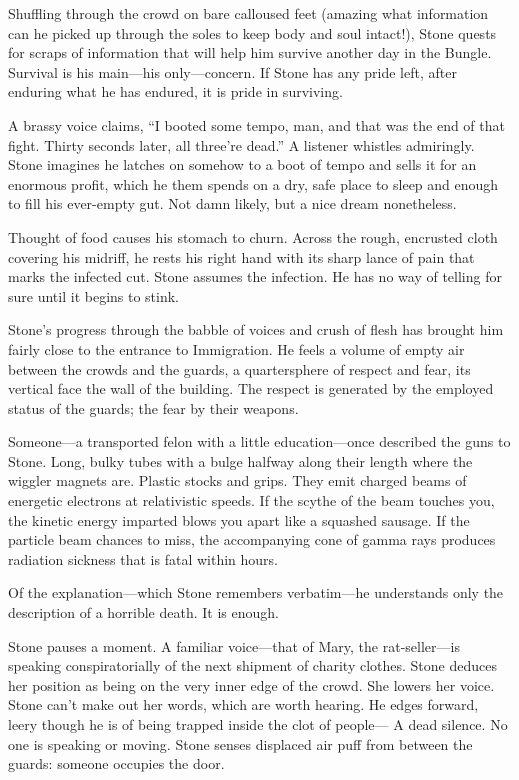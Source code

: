 Shuffling through the crowd on bare calloused feet (amazing what information can he picked up through the soles to keep body and soul intact!), Stone quests for scraps of information that will help him survive another day in the Bungle. Survival is his main—his only—concern. If Stone has any pride left, after enduring what he has endured, it is pride in surviving.

A brassy voice claims, “I booted some tempo, man, and that was the end of that fight. Thirty seconds later, all three’re dead.” A listener whistles admiringly. Stone imagines he latches on somehow to a boot of tempo and sells it for an enormous profit, which he them spends on a dry, safe place to sleep and enough to fill his ever-empty gut. Not damn likely, but a nice dream nonetheless.

Thought of food causes his stomach to churn. Across the rough, encrusted cloth covering his midriff, he rests his right hand with its sharp lance of pain that marks the infected cut. Stone assumes the infection. He has no way of telling for sure until it begins to stink.

Stone’s progress through the babble of voices and crush of flesh has brought him fairly close to the entrance to Immigration. He feels a volume of empty air between the crowds and the guards, a quartersphere of respect and fear, its vertical face the wall of the building. The respect is generated by the employed status of the guards; the fear by their weapons.

Someone—a transported felon with a little education—once described the guns to Stone. Long, bulky tubes with a bulge halfway along their length where the wiggler magnets are. Plastic stocks and grips. They emit charged beams of energetic electrons at relativistic speeds. If the scythe of the beam touches you, the kinetic energy imparted blows you apart like a squashed sausage. If the particle beam chances to miss, the accompanying cone of gamma rays produces radiation sickness that is fatal within hours.

Of the explanation—which Stone remembers verbatim—he understands only the description of a horrible death. It is enough.

Stone pauses a moment. A familiar voice—that of Mary, the rat-seller—is speaking conspiratorially of the next shipment of charity clothes. Stone deduces her position as being on the very inner edge of the crowd. She lowers her voice. Stone can’t make out her words, which are worth hearing. He edges forward, leery though he is of being trapped inside the clot of people— A dead silence. No one is speaking or moving. Stone senses displaced air puff from between the guards: someone occupies the door.

